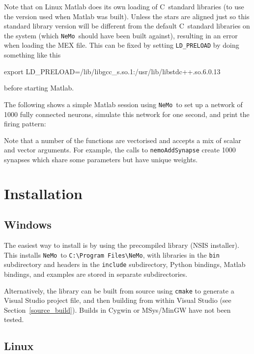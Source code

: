 \documentclass[a4paper]{article}
\newcommand{\nemo}{\texttt{NeMo}}
\newcommand{\code}[1]{\texttt{#1}}
\newcommand{\command}[1]{\texttt{#1}}
\newcommand{\directory}[1]{\texttt{#1}}
\newcommand{\cpp}{C\nolinebreak\hspace{-.05em}\raisebox{.4ex}{\tiny\bf +}\nolinebreak\hspace{-.10em}\raisebox{.4ex}{\tiny\bf +}}
\begin{document}
Note that on Linux Matlab does its own loading of \cpp\ standard libraries
	(to use the version used when Matlab was built).
Unless the stars are aligned just so this standard library version will be
different from the default \cpp\ standard libraries on the system (which \nemo\ should have been built against), resulting in an error when loading the MEX file.
This can be fixed by setting \code{LD\_PRELOAD} by doing something like this

\begin{shell}
export LD_PRELOAD=/lib/libgcc_s.so.1:/usr/lib/libstdc++.so.6.0.13
\end{shell}

before starting Matlab.

The following shows a simple Matlab session using \nemo\ to set up a network of
1000 fully connected neurons, simulate this network for one second, and print
the firing pattern:



Note that a number of the functions are vectorised and accepts a mix of scalar
and vector arguments. For example, the calls to \code{nemoAddSynapse} create
1000 synapses which share some parameters but have unique weights.

\newpage

\section{Installation}
\label{installation}

\subsection{Windows}
\label{installation:windows}

The easiest way to install is by using the precompiled library (NSIS installer).
This installs \nemo\ to \directory{C:\textbackslash Program Files\textbackslash NeMo},
	with
		libraries in the \directory{bin} subdirectory and
		headers in the \directory{include} subdirectory,
Python bindings, Matlab bindings, and examples are stored in separate subdirectories.

Alternatively, the library can be built from source using \command{cmake} to generate a Visual Studio project file,
	and then building from within Visual Studio (see Section~\ref{source_build}).
Builds in Cygwin or MSys/MinGW have not been tested.

\subsection{Linux}
\end{document}
